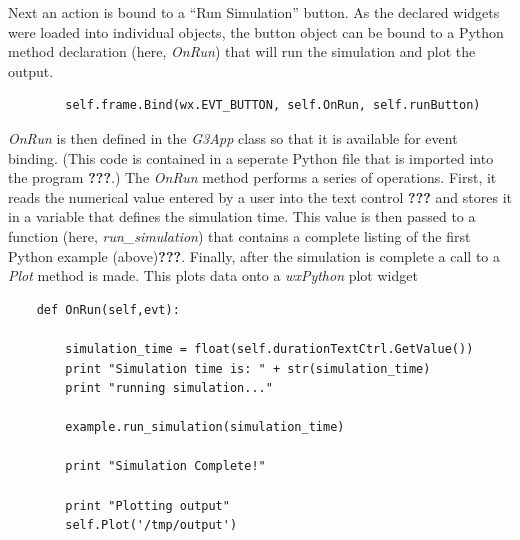 \documentclass[12pt]{article}
\begin{document}
Next an action is bound to a ``Run Simulation'' button. As the declared widgets were loaded into individual objects, the button object can be bound to a Python method declaration (here,  {\it OnRun})
that will run the simulation and plot the output.

{\footnotesize
   \resetlinenumber[25]
   \linenumbers
 \begin{verbatim}
        self.frame.Bind(wx.EVT_BUTTON, self.OnRun, self.runButton)
 \end{verbatim} 
}



% 


{\it OnRun} is then defined in the {\it G3App} class so that it is available for event binding. (This code is contained in a seperate 
Python file that is imported into the program {\bf ???}.) The {\it OnRun} method performs 
a series of operations. First, it reads the numerical value 
entered by a user into the text control {\bf ???} and stores it in a variable 
that defines the simulation time. This value is then passed to a function (here, {\it run\_simulation}) that contains a complete listing of 
the first Python example (above){\bf ???}.  Finally, 
after the simulation is complete a call to a {\it Plot} method is made. 
This plots data onto a {\it wxPython} plot widget

{\footnotesize
  \resetlinenumber[36]
  \linenumbers
\begin{verbatim}
    def OnRun(self,evt):

        simulation_time = float(self.durationTextCtrl.GetValue())
        print "Simulation time is: " + str(simulation_time)
        print "running simulation..."

        example.run_simulation(simulation_time)

        print "Simulation Complete!"

        print "Plotting output"
        self.Plot('/tmp/output')
\end{verbatim}
}
 
\end{document}
